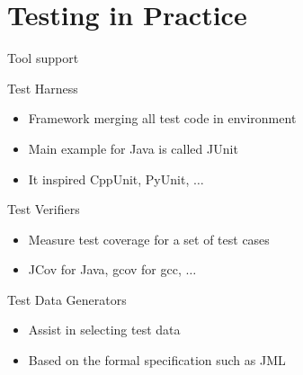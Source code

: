 \section{Testing in Practice}\sectionpage
\begin{frame}{Tool support}
  \begin{block}{Test Harness}
    \begin{itemize}
    \item Framework merging all test code in environment
    \item Main example for Java is called \alert{JUnit}
    \item It inspired CppUnit, PyUnit, $\ldots$
    \end{itemize}
  \end{block}
  \begin{block}{Test Verifiers}
    \begin{itemize}
    \item Measure test coverage for a set of test cases
    \item JCov for Java, gcov for gcc, $\ldots$
    \end{itemize}
  \end{block}
  \begin{block}{Test Data Generators}
    \begin{itemize}
    \item Assist in selecting test data
    \item Based on the formal specification such as JML
    \end{itemize}
  \end{block}
\end{frame}

